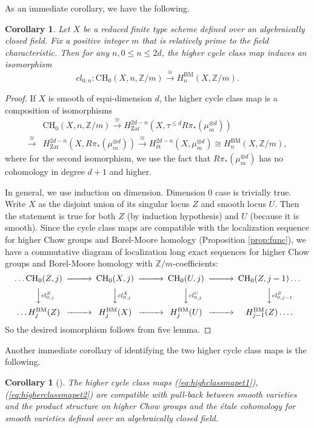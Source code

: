 \documentclass{amsart}
\newtheorem{cor}[theorem]{Corollary}
\theoremstyle{definition}
\theoremstyle{remark}
\newcommand{\mbb}{\mathbb}
\newcommand{\ZZ}{\mbb{Z}}
\newcommand{\et}{\text{\'et}}
\begin{document}
As an immediate corollary, we have the following.
\begin{cor}\label{cor:ch_BM}
    Let $X$ be a reduced finite type scheme defined over an algebraically closed field. Fix a positive integer $m$ that is relatively prime to the field characteristic. Then for any $n, 0 \leq n \leq 2d$, the higher cycle class map induces an  isomorphism
    \[
    cl_{0, n}:\text{CH}_0(X, n, \ZZ/m) \xrightarrow{\cong} H_n^{\text{BM}}(X, \ZZ/m).
    \]
\end{cor}
\begin{proof}
    If $X$ is smooth of equi-dimension $d$, the higher cycle class map is a composition of isomorphisms
    \begin{align*}
        &\text{CH}_0(X, n, \ZZ/m) \xrightarrow{\cong} H_{\text{Zar}}^{2d-n}(X, \tau^{\leq d}R\pi_*(\mu_m^{\otimes d})) \\
        \xrightarrow{\cong} &H_{\text{Zar}}^{2d-n}(X, R\pi_*(\mu_m^{\otimes d}))\xrightarrow{\cong} H^{2d-n}_\et(X, \mu_m^{\otimes d}) \cong H_n^{\text{BM}}(X, \ZZ/m),
    \end{align*}
    where for the second isomorphism, we use the fact that $R\pi_*(\mu_m^{\otimes d})$ has no cohomology in degree $d+1$ and higher.
    
    In general, we use induction on dimension. Dimension $0$ case is trivially true. Write $X$ as the disjoint union of its singular locus $Z$ and smooth locus $U$. Then the statement is true for both $Z$ (by induction hypothesis) and $U$ (because it is smooth). Since the cycle class maps are compatible with the localization sequence for higher Chow groups and Borel-Moore homology (Proposition \ref{prop:func}), we have a commutative diagram of localization long exact sequences for higher Chow groups and Borel-Moore homology with $\ZZ/m$-coefficients:
    \[
    \begin{CD}
       \ldots \text{CH}_0(Z, j) @>>>\text{CH}_0(X, j) @>>>\text{CH}_0(U, j) @>>>\text{CH}_0(Z, j-1) \ldots \\
        @VVcl_{0, j}^Z V @VVcl_{0, j}^X V @VVcl_{0, j}^U V @VVcl_{0, j-1}^ZV\\
       \ldots H_{j}^{\text{BM}}(Z) @>>>H_{j}^{\text{BM}}(X) @>>>H_{j}^{\text{BM}}(U) @>>>H_{j-1}^{\text{BM}}(Z)\ldots .\\
    \end{CD}
    \]
    So the desired isomorphism follows from five lemma.
\end{proof}

Another immediate corollary of identifying the two higher cycle class maps \cite[Proposition 4.4]{kok_Zhou} is the following.
\begin{cor}[{\cite[Proposition 4.2(i), 4.7]{Geisser_Levine}}]\label{cor:pull-back}
    The higher cycle class maps (\ref{eq:highclassmapet1}), (\ref{eq:higherclassmapet2}) are compatible with pull-back between smooth varieties and the product structure on higher Chow groups and the \'etale cohomology for smooth varieties defined over an algebraically closed field.
\end{cor}
\end{document}
